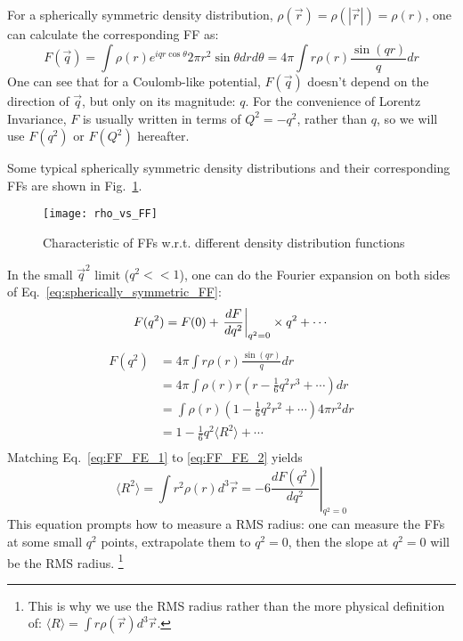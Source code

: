 For a spherically symmetric density distribution, 
$\rho(\vec{r}) = \rho({|\vec{r}|}) = \rho(r)$, 
one can calculate the corresponding FF as:
\begin{equation}
    F(\vec{q}) = \int \rho(r) e^{iqr\cos\theta} 2\pi r^2 \sin\theta dr d\theta
	= 4\pi \int r \rho(r) \frac{\sin{(qr)}}{q} dr
    \label{eq:spherically_symmetric_FF}
\end{equation}
One can see that for a Coulomb-like potential, $F(\vec{q})$ doesn't depend on
the direction of $\vec{q}$, but only on its magnitude: $q$. For the convenience 
of Lorentz Invariance, $F$ is usually written in terms of $Q^2 = -q^2$, rather
than $q$, so we will use $F(q^2)$ or $F(Q^2)$ hereafter.

Some typical spherically symmetric density distributions and their 
corresponding FFs are shown in Fig.~\ref{fig:FFs}.
\begin{figure}[!h]
    \texttt{[image: rho\_vs\_FF]}
    \caption{Characteristic of FFs w.r.t. different density distribution functions}
    \label{fig:FFs}
\end{figure}

In the small $\vec{q}^2$ limit ($q^2 << 1$), one can do the Fourier expansion on both
sides of Eq.~\ref{eq:spherically_symmetric_FF}:
\begin{equation}
    F(q^2) = F(0) + \left.\frac{dF}{dq^2}\right|_{q^2=0} \times q^2 + \cdots	\\
    \label{eq:FF_FE_1}
\end{equation}
\begin{equation}
    \begin{aligned}
	F(q^2) &= 4\pi \int r \rho(r) \frac{\sin{(qr)}}{q} dr \\
	    &= 4\pi \int \rho(r) r \left( r - \frac{1}{6} q^2r^3 + \cdots \right) dr	\\
	    &= \int \rho(r)  \left( 1 - \frac{1}{6} q^2r^2 + \cdots \right) 4\pi r^2 dr	\\
	    &= 1 - \frac{1}{6}q^2\langle R^2 \rangle + \cdots \\
    \end{aligned}
    \label{eq:FF_FE_2}
\end{equation}
Matching Eq.~\ref{eq:FF_FE_1} to \ref{eq:FF_FE_2} yields
\begin{equation}
    \langle R^2 \rangle = \int r^2 \rho(r) d^3\vec{r} = -6 \left. \frac{dF(q^2)}{dq^2} \right|_{q^2 = 0}
\end{equation}
This equation prompts how to measure a RMS radius:
one can measure the FFs at some small $q^2$ points, extrapolate them 
to $q^2 = 0$, then the slope at $q^2 = 0$ will be the RMS radius.
\footnote{This is why we use the RMS radius rather than the more physical definition of: 
$\langle R \rangle = \int  r \rho(\vec{r}) d^3\vec{r}$.}


